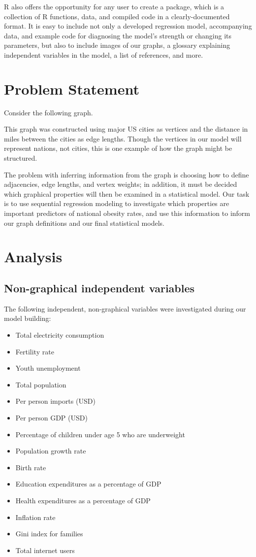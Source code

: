 \documentclass[oneside,12pt]{report}
\begin{document}
R also offers the opportunity for any user to create a package, which is a collection of R functions, data, and compiled code in a clearly-documented format. It is easy to include not only a developed regression model, accompanying data, and example code for diagnosing the model's strength or changing its parameters, but also to include images of our graphs, a glossary explaining independent variables in the model, a list of references, and more.

\chapter{Problem Statement}

Consider the following graph.

This graph was constructed using major US cities as vertices and the distance in miles between the cities as edge lengths. Though the vertices in our model will represent nations, not cities, this is one example of how the graph might be structured.

The problem with inferring information from the graph is choosing how to define adjacencies, edge lengths, and vertex weights; in addition,
it must be decided which graphical properties will then be examined in a statistical model. Our task is to use sequential regression modeling to
investigate which properties are important predictors of national obesity rates, and use this information to inform our graph definitions and our final statistical models.

\chapter{Analysis}

\section*{Non-graphical independent variables}

The following independent, non-graphical variables were investigated during our model building:
\begin{itemize}
\item Total electricity consumption
\item Fertility rate
\item Youth unemployment
\item Total population
\item Per person imports (USD)
\item Per person GDP (USD)
\item Percentage of children under age 5 who are underweight
\item Population growth rate
\item Birth rate
\item Education expenditures as a percentage of GDP
\item Health expenditures as a percentage of GDP
\item Inflation rate
\item Gini index for families
\item Total internet users
\end{itemize}
\end{document}
